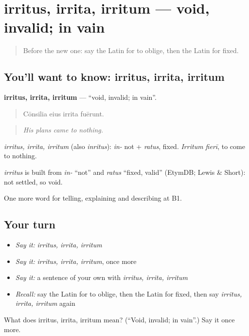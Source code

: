 \section[irritus, irrita, irritum]{irritus, irrita, irritum — void, invalid; in vain}

\label{lesson:LA-C398-irritus}



\begin{quote}
Before the new one: say the Latin for to oblige, then the Latin for fixed.
\end{quote}

\subsection*{You'll want to know: irritus, irrita, irritum}
\textbf{irritus, irrita, irritum} — \textquotedblleft{}void, invalid; in vain\textquotedblright{}.

\begin{quote}
Cōnsilia eius irrita fuērunt.
\end{quote}

\begin{quote}
\emph{His plans came to nothing.}
\end{quote}

\emph{irritus, irrita, irritum} (also \emph{inritus}): \emph{in-} not + \emph{ratus}, fixed. \emph{Irritum fierī}, to come to nothing.

\begin{cousinweb}
\emph{irritus} is built from \emph{in-} \textquotedblleft{}not\textquotedblright{} and \emph{ratus} \textquotedblleft{}fixed, valid\textquotedblright{} (EtymDB; Lewis \& Short): not settled, so void.
\end{cousinweb}

\begin{grammarlens}[title={What you've built}]
One more word for telling, explaining and describing at B1.
\end{grammarlens}

\subsection*{Your turn}
\begin{itemize}
\raggedright
  \item \emph{Say it:} \emph{irritus, irrita, irritum}
  \item \emph{Say it:} \emph{irritus, irrita, irritum}, once more
  \item \emph{Say it:} a sentence of your own with \emph{irritus, irrita, irritum}
  \item \emph{Recall:} say the Latin for to oblige, then the Latin for fixed, then say \emph{irritus, irrita, irritum} again
\end{itemize}

\begin{tcolorbox}[breakable,colback=teal!4,colframe=teal!35!black,title={Before you move on}]
What does irritus, irrita, irritum mean? (\textquotedblleft{}Void, invalid; in vain\textquotedblright{}.) Say it once more.
\end{tcolorbox}
